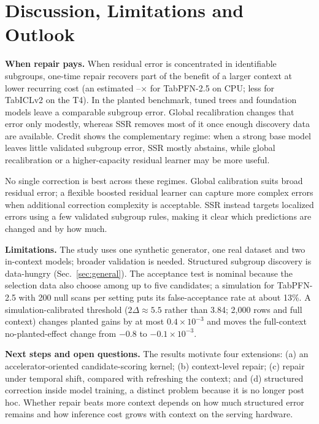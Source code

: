 \documentclass[conference]{IEEEtran}
\begin{document}
\section{Discussion, Limitations and Outlook}\label{sec:disc}
\textbf{When repair pays.} When residual error is concentrated in identifiable subgroups, one-time
repair recovers part of the benefit of a larger context at lower recurring cost (an estimated
\CrEqScanCpu--\PlEqScanCpu$\times$ for TabPFN-2.5 on CPU; less for TabICLv2 on the T4). In the planted benchmark, tuned trees and foundation models leave a
comparable subgroup error. Global recalibration changes that error only modestly, whereas SSR
removes most of it once enough discovery data are available. Credit shows the complementary regime: when a
strong base model leaves little validated subgroup error, SSR mostly abstains, while global
recalibration or a higher-capacity residual learner may be more useful.

No single correction is best across these regimes. Global calibration suits broad residual error; a flexible boosted residual learner can capture more complex errors when additional correction complexity is acceptable. SSR instead targets localized errors using a few validated subgroup rules, making it clear which predictions are changed and by how much.

\textbf{Limitations.} The study uses one synthetic generator, one real dataset and two in-context
models; broader validation is needed. Structured subgroup discovery is data-hungry
(Sec.~\ref{sec:general}). The acceptance test is nominal because the selection data
also choose among up to five candidates; a simulation for TabPFN-2.5 with 200 null scans per setting
puts its false-acceptance rate at about 13\%. A simulation-calibrated threshold ($2\Delta\approx5.5$ rather than 3.84; 2{,}000 rows and full
context) changes planted gains by at most $0.4\times10^{-3}$ and moves the full-context
no-planted-effect change from $-0.8$ to $-0.1\times10^{-3}$.

\textbf{Next steps and open questions.} The results motivate four extensions: (a) an
accelerator-oriented candidate-scoring kernel; (b) context-level repair; (c) repair under temporal
shift, compared with refreshing the context; and (d) structured correction inside model training,
a distinct problem because it is no longer post hoc. Whether repair beats more context depends on how much
structured error remains and how inference cost grows with context on the serving hardware.
\end{document}
